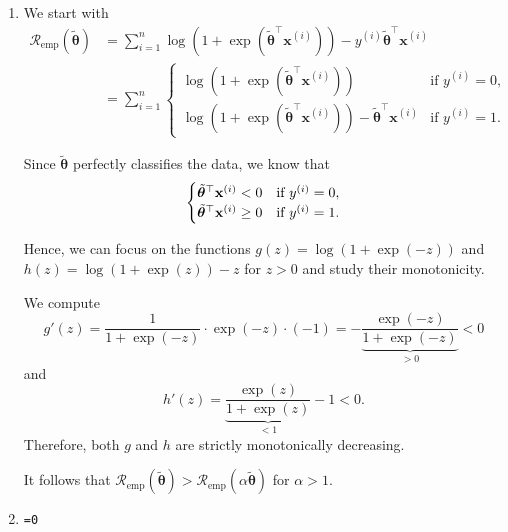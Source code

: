 \documentclass[a4paper]{article}
\makeatletter
\newcommand{\hlnum}[1]{\textcolor[rgb]{0.686,0.059,0.569}{#1}}%
\newcommand{\hlkwb}[1]{\textcolor[rgb]{0.69,0.353,0.396}{#1}}%
\newenvironment{kframe}{%
 \def\at@end@of@kframe{}%
 \ifinner\ifhmode%
  \def\at@end@of@kframe{\end{minipage}}%
  \begin{minipage}{\columnwidth}%
 \fi\fi%
 \def\FrameCommand##1{\hskip\@totalleftmargin \hskip-\fboxsep
 \colorbox{shadecolor}{##1}\hskip-\fboxsep
     \hskip-\linewidth \hskip-\@totalleftmargin \hskip\columnwidth}%
 \MakeFramed {\advance\hsize-\width
   \@totalleftmargin\z@ \linewidth\hsize
   \@setminipage}}%
 {\par\unskip\endMakeFramed%
 \at@end@of@kframe}
\newenvironment{knitrout}{}{} %
\makeatother
\begin{document}
{\begin{enumerate}
\item
We start with
\begin{align*}
  \mathcal{R}_\text{emp}(\tilde{\bm{\theta}}) &= \sum^n_{i=1} \log(1 + \exp(\tilde{\bm{\theta}}^\top \mathbf{x}^{(i)})) - y^{(i)}\tilde{\bm{\theta}}^\top \mathbf{x}^{(i)} \\
  &= \sum^n_{i=1} \begin{cases}
    \log(1 + \exp(\tilde{\bm{\theta}}^\top \mathbf{x}^{(i)})) & \text{if $y^{(i)} = 0$}, \\
    \log(1 + \exp(\tilde{\bm{\theta}}^\top \mathbf{x}^{(i)})) - \tilde{\bm{\theta}}^\top \mathbf{x}^{(i)} & \text{if $y^{(i)} = 1$}.
  \end{cases}
\end{align*}

Since $\tilde{\bm{\theta}}$ perfectly classifies the data, we know that
\begin{equation*}
  \begin{cases}
    \tilde{\bm{\theta}}^\top \mathbf{x}^{(i)} < 0 & \text{if $y^{(i)} = 0$}, \\
    \tilde{\bm{\theta}}^\top \mathbf{x}^{(i)} \geq 0 & \text{if $y^{(i)} = 1$}.
  \end{cases}
\end{equation*}

Hence, we can focus on the functions $g(z) = \log(1 + \exp(-z))$ and $h(z) = \log(1 + \exp(z)) - z$ for $z > 0$ and study their monotonicity.

We compute
\begin{equation*}
  g'(z) = \frac{1}{1 + \exp(-z)} \cdot \exp(-z) \cdot (-1) = - \underbrace{\frac{\exp(-z)}{1 + \exp(-z)}}_{> 0} < 0
\end{equation*}
and
\begin{equation*}
  h'(z) = \underbrace{\frac{\exp(z)}{1 + \exp(z)}}_{< 1} - 1 < 0.
\end{equation*}
Therefore, both $g$ and $h$ are strictly monotonically decreasing.

It follows that $\mathcal{R}_\text{emp}(\tilde{\bm{\theta}}) > \mathcal{R}_\text{emp}(\alpha \tilde{\bm{\theta}})$ for $\alpha > 1$.

\item
\begin{knitrout}
\color{fgcolor}\begin{kframe}
\begin{alltt}
 \hlkwb{=} \hlnum{0}


\end{alltt}
\end{kframe}
\end{knitrout}
\end{enumerate}}
\end{document}

